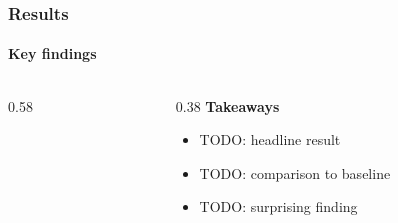 
\begin{frame}
	\frametitle{Results}
	\framesubtitle{Key findings}

	\begin{columns}[T]
		\begin{column}{0.58\linewidth}
		\end{column}
		\begin{column}{0.38\linewidth}
			\textbf{Takeaways}
			\begin{itemize}
				\item TODO: headline result
				\item TODO: comparison to baseline
				\item TODO: surprising finding
			\end{itemize}
		\end{column}
	\end{columns}
\end{frame}
